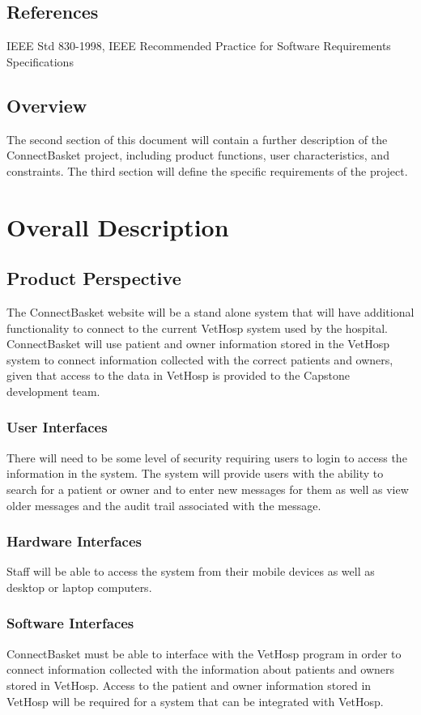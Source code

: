 \documentclass[onecolumn, draftclsnofoot,10pt, compsoc]{IEEEtran}
\begin{document}
\subsection{References}
IEEE Std 830-1998, IEEE Recommended Practice for Software Requirements Specifications

\subsection{Overview}
The second section of this document will contain a further description of the ConnectBasket project, including product functions, user characteristics, and constraints. The third section will define the specific requirements of the project. 

\section{Overall Description}

\subsection{Product Perspective}
The ConnectBasket website will be a stand alone system that will have additional functionality to connect to the current VetHosp system used by the hospital. ConnectBasket will use patient and owner information stored in the VetHosp system to connect information collected with the correct patients and owners, given that access to the data in VetHosp is provided to the Capstone development team.

\subsubsection{User Interfaces}
There will need to be some level of security requiring users to login to access the information in the system. The system will provide users with the ability to search for a patient or owner and to enter new messages for them as well as view older messages and the audit trail associated with the message.

\subsubsection{Hardware Interfaces}
Staff will be able to access the system from their mobile devices as well as desktop or laptop computers.

\subsubsection{Software Interfaces}
ConnectBasket must be able to interface with the VetHosp program in order to connect information collected with the information about patients and owners stored in VetHosp. Access to the patient and owner information stored in VetHosp will be required for a system that can be integrated with VetHosp.
\end{document}
